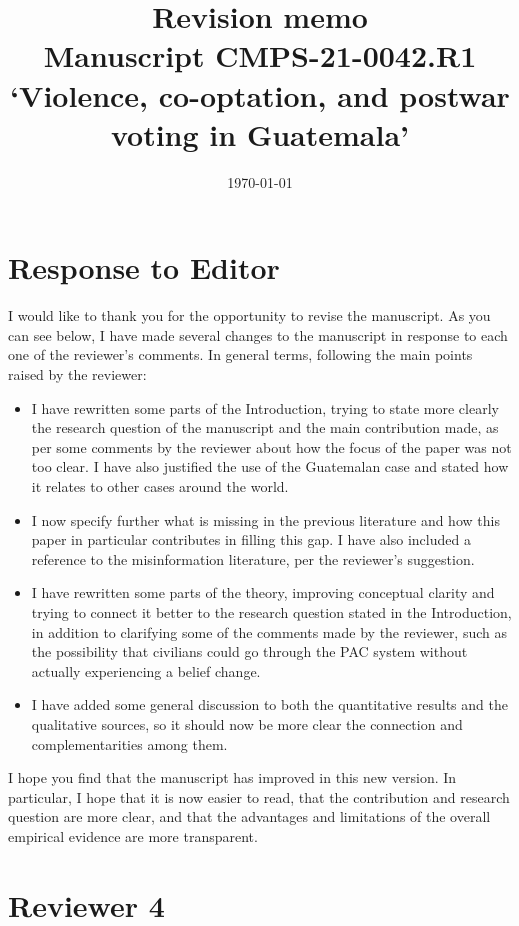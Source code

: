 \documentclass[12pt, a4paper, notitlepage]{article}
\title{\large \textbf{Revision memo}\\{\large Manuscript CMPS-21-0042.R1\\`Violence, co-optation, and postwar voting in Guatemala'}}
\author{}
\date{\today}
\begin{document}
\maketitle

\section*{Response to Editor}

I would like to thank you for the opportunity to revise the manuscript. As you can see below, I have made several changes to the manuscript in response to each one of the reviewer's comments. In general terms, following the main points raised by the reviewer:

\begin{itemize}
  \item I have rewritten some parts of the Introduction, trying to state more clearly the research question of the manuscript and the main contribution made, as per some comments by the reviewer about how the focus of the paper was not too clear. I have also justified the use of the Guatemalan case and stated how it relates to other cases around the world.
  \item I now specify further what is missing in the previous literature and how this paper in particular contributes in filling this gap. I have also included a reference to the misinformation literature, per the reviewer's suggestion.
  \item I have rewritten some parts of the theory, improving conceptual clarity and trying to connect it better to the research question stated in the Introduction, in addition to clarifying some of the comments made by the reviewer, such as the possibility that civilians could go through the PAC system without actually experiencing a belief change.
  \item I have added some general discussion to both the quantitative results and the qualitative sources, so it should now be more clear the connection and complementarities among them.
\end{itemize}

I hope you find that the manuscript has improved in this new version. In particular, I hope that it is now easier to read, that the contribution and research question are more clear, and that the advantages and limitations of the overall empirical evidence are more transparent.


\newpage
\section*{Reviewer 4}
\end{document}
